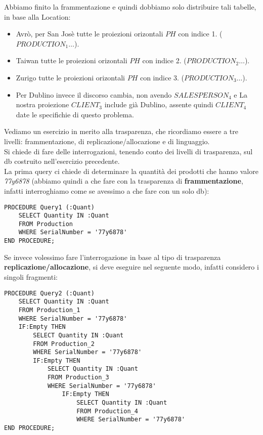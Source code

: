 Abbiamo finito la frammentazione e quindi dobbiamo solo distribuire tali tabelle, in base alla Location: 
\begin{itemize}
 \item Avrò, per San Josè tutte le proiezioni orizontali $PH$ con indice 1. ($PRODUCTION_1 \dots$).
 \item Taiwan tutte le proiezioni orizontali $PH$ con indice 2. ($PRODUCTION_2 \dots$).
 \item Zurigo tutte le proiezioni orizontali $PH$ con indice 3. ($PRODUCTION_3 \dots$).
 \item Per Dublino invece il discorso cambia, non avendo $SALESPERSON_4$ e La nostra proiezione $CLIENT_3$ include già Dublino, assente quindi $CLIENT_4$ date le specifichie di questo problema. 
\end{itemize}

Vediamo un esercizio in merito alla trasparenza, che ricordiamo essere a tre livelli: frammentazione, di replicazione/allocazione e di linguaggio.\\


Si chiede di fare delle interrogazioni, tenendo conto dei livelli di trasparenza, sul db costruito nell'esercizio precedente.\\ 
La prima query ci chiede di determinare la quantità dei prodotti che hanno valore \textit{77y6878} (abbiamo quindi a che fare con la trasparenza di \textbf{frammentazione}, infatti interroghiamo come se avessimo a che fare con un solo db):
\begin{lstlisting}
PROCEDURE Query1 (:Quant)
    SELECT Quantity IN :Quant
    FROM Production
    WHERE SerialNumber = '77y6878'
END PROCEDURE;
\end{lstlisting}
Se invece volessimo fare l'interrogazione in base al tipo di trasparenza \textbf{replicazione/allocazione}, si deve eseguire nel seguente modo, infatti considero i singoli fragmenti:

\begin{lstlisting}
PROCEDURE Query2 (:Quant)
    SELECT Quantity IN :Quant
    FROM Production_1
    WHERE SerialNumber = '77y6878'
    IF:Empty THEN 
        SELECT Quantity IN :Quant
        FROM Production_2
        WHERE SerialNumber = '77y6878'
        IF:Empty THEN 
            SELECT Quantity IN :Quant
            FROM Production_3
            WHERE SerialNumber = '77y6878'
                IF:Empty THEN 
                    SELECT Quantity IN :Quant
                    FROM Production_4
                    WHERE SerialNumber = '77y6878'
END PROCEDURE;
\end{lstlisting}

